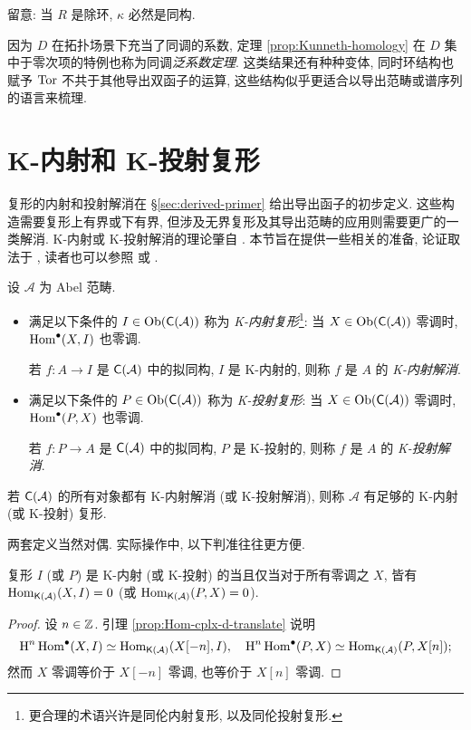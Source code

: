 留意: 当 $R$ 是除环, $\kappa$ 必然是同构.

因为 $D$ 在拓扑场景下充当了同调的系数, 定理 \ref{prop:Kunneth-homology} 在 $D$ 集中于零次项的特例也称为同调\emph{泛系数定理}. 这类结果还有种种变体, 同时环结构也赋予 $\operatorname{Tor}$ 不共于其他导出双函子的运算, 这些结构似乎更适合以导出范畴或谱序列的语言来梳理.

\section{K-内射和 K-投射复形}\label{sec:K-injectives}
复形的内射和投射解消在 \S\ref{sec:derived-primer} 给出导出函子的初步定义. 这些构造需要复形上有界或下有界, 但涉及无界复形及其导出范畴的应用则需要更广的一类解消. K-内射或 K-投射解消的理论肇自 \cite{Spa88}. 本节旨在提供一些相关的准备, 论证取法于 \cite{stacks}, 读者也可以参照 \cite[Chapter 14]{KS06} 或 \cite{BN93}.

\begin{definition}[N.\ Spaltenstein]\label{def:K-resolutions}
	设 $\mathcal{A}$ 为 Abel 范畴.
	\begin{itemize}
		\item 满足以下条件的 $I \in \operatorname{Ob}(\mathsf{C}(\mathcal{A}))$ 称为 \emph{K-内射复形}\footnote{更合理的术语兴许是同伦内射复形, 以及同伦投射复形.}: 当 $X \in \operatorname{Ob}(\mathsf{C}(\mathcal{A}))$ 零调时, $\operatorname{Hom}^\bullet(X, I)$ 也零调.
		
		若 $f: A \to I$ 是 $\mathsf{C}(\mathcal{A})$ 中的拟同构, $I$ 是 K-内射的, 则称 $f$ 是 $A$ 的 \emph{K-内射解消}.
		\item 满足以下条件的 $P \in \operatorname{Ob}(\mathsf{C}(\mathcal{A}))$ 称为 \emph{K-投射复形}: 当 $X \in \operatorname{Ob}(\mathsf{C}(\mathcal{A}))$ 零调时, $\operatorname{Hom}^\bullet(P, X)$ 也零调.
		
		若 $f: P \to A$ 是 $\mathsf{C}(\mathcal{A})$ 中的拟同构, $P$ 是 K-投射的, 则称 $f$ 是 $A$ 的 \emph{K-投射解消}.
	\end{itemize}

	若 $\mathsf{C}(\mathcal{A})$ 的所有对象都有 K-内射解消 (或 K-投射解消), 则称 $\mathcal{A}$ 有足够的 K-内射 (或 K-投射) 复形.
\end{definition}

两套定义当然对偶. 实际操作中, 以下判准往往更方便.
\begin{lemma}\label{prop:K-injective-criterion}
	复形 $I$ (或 $P$) 是 K-内射 (或 K-投射) 的当且仅当对于所有零调之 $X$, 皆有 $\operatorname{Hom}_{\mathsf{K}(\mathcal{A})}(X, I) = 0$ (或 $\operatorname{Hom}_{\mathsf{K}(\mathcal{A})}(P, X) = 0$).
\end{lemma}
\begin{proof}
	设 $n \in \mathbb{Z}$. 引理 \ref{prop:Hom-cplx-d-translate} 说明
	\[ \operatorname{H}^n \operatorname{Hom}^\bullet(X, I) \simeq \operatorname{Hom}_{\mathsf{K}(\mathcal{A})}(X[-n], I), \quad \operatorname{H}^n \operatorname{Hom}^\bullet(P, X) \simeq \operatorname{Hom}_{\mathsf{K}(\mathcal{A})}(P, X[n]); \]
	然而 $X$ 零调等价于 $X[-n]$ 零调, 也等价于 $X[n]$ 零调.
\end{proof}

